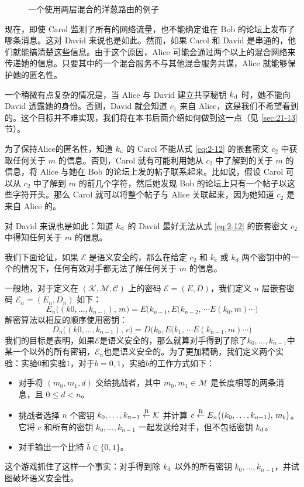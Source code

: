 \begin{figure}
	\centering
	
	\caption{一个使用两层混合的洋葱路由的例子}
	\label{fig:2-7}
\end{figure}

现在，即使 Carol 监测了所有的网络流量，也不能确定谁在 Bob 的论坛上发布了哪条消息。这对 David 来说也是如此。然而，如果 Carol 和 David 是串通的，他们就能搞清楚这些信息。由于这个原因，Alice 可能会通过两个以上的混合网络来传递她的信息。只要其中的一个混合服务不与其他混合服务共谋，Alice 就能够保护她的匿名性。

一个稍微有点复杂的情况是，当 Alice 与 David 建立共享秘钥 $k_{\rm d}$ 时，她不能向 David 透露她的身份。否则，David 就会知道 $c_1$ 来自 Alice，这是我们不希望看到的。这个目标并不难实现，我们将在本书后面介绍如何做到这一点（见 \ref{sec:21-13} 节）。

\begin{snote}[嵌套加密的安全性。]
为了保持Alice的匿名性，知道 $k_{\rm c}$ 的 Carol 不能从式 \ref{eq:2-12} 的嵌套密文 $c_2$ 中获取任何关于 $m$ 的信息。否则，Carol 就有可能利用她从 $c_2$ 中了解到的关于 $m$ 的信息，将 Alice 与她在 Bob 的论坛上发的帖子联系起来。比如说，假设 Carol 可以从 $c_2$ 中了解到 $m$ 的前几个字符，然后她发现 Bob 的论坛上只有一个帖子以这些字符开头。那么 Carol 就可以将整个帖子与 Alice 关联起来，因为她知道 $c_2$ 是来自 Alice 的。

对 David 来说也是如此：知道 $k_{\rm d}$ 的 David 最好无法从式 \ref{eq:2-12} 的嵌套密文 $c_2$ 中得知任何关于 $m$ 的信息。

我们下面论证，如果 $\mathcal{E}$ 是语义安全的，那么在给定 $c_2$ 和 $k_c$ 或 $k_d$ 两个密钥中的一个的情况下，任何有效对手都无法了解任何关于 $m$ 的信息。
\end{snote}

一般地，对于定义在 $(\mathcal{K},\mathcal{M},\mathcal{C})$ 上的密码 $\mathcal{E}=(E,D)$，我们定义 $n$ 层嵌套密码 $\mathcal{E}_n=(E_n,D_n)$ 如下：
\[
E_n\big((k0,\dots,k_{n-1}),\,m\big)=E\big(k_{n-1},E(k_{n-2},\,\cdots E(k_0,m)\cdots\big)
\]
解密算法以相反的顺序使用密钥：
\[
D_n\big((k0,\dots,k_{n-1}),\,c\big)=D\big(k_0,E(k_1,\,\cdots E(k_{n-1},m)\cdots\big)
\]
我们的目标是表明，如果$\mathcal{E}$是语义安全的，那么就算对手得到了除了$k_0,\dots,k_{n-1}$中某一个以外的所有密钥，$\mathcal{E}_n$也是语义安全的。为了更加精确，我们定义两个实验：实验$0$和实验$1$，对于$b=0,1$，实验$b$的工作方式如下：
\begin{itemize}
	\item 对手将 $(m_0,m_1,d)$ 交给挑战者，其中 $m_0,m_1\in\mathcal{M}$ 是长度相等的两条消息，且 $0\leq d<n$。
	\item 挑战者选择 $n$ 个密钥 $k_0,\dots,k_{n-1}\overset{\rm R}\leftarrow\mathcal{K}$ 并计算 $c\overset{\rm R}\leftarrow E_n\big((k_0,\dots,k_{n-1}),\,m_b\big)$。它将 $c$ 和所有的密钥 $k_0,\dots,k_{n-1}$ 一起发送给对手，但不包括密钥 $k_{\rm d}$。
	\item 对手输出一个比特 $\hat b\in\{0,1\}$。
\end{itemize}
这个游戏抓住了这样一个事实：对手得到除 $k_{\rm d}$ 以外的所有密钥 $k_0,\dots,k_{n-1}$，并试图破坏语义安全性。

